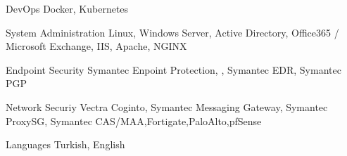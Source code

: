 

\begin{cvskills}

  \cvskill
    {DevOps} %
    {Docker, Kubernetes} %

  \cvskill
    {System Administration} %
    {Linux, Windows Server, Active Directory, Office365 / Microsoft Exchange, IIS, Apache, NGINX} %

  \cvskill
    {Endpoint Security} %
    {Symantec Enpoint Protection, , Symantec EDR, Symantec PGP} %

  \cvskill
    {Network Securiy} %
    {Vectra Coginto, Symantec Messaging Gateway, Symantec ProxySG, Symantec CAS/MAA,Fortigate,PaloAlto,pfSense } %

  \cvskill
    {Languages} %
    {Turkish, English} %

\end{cvskills}
